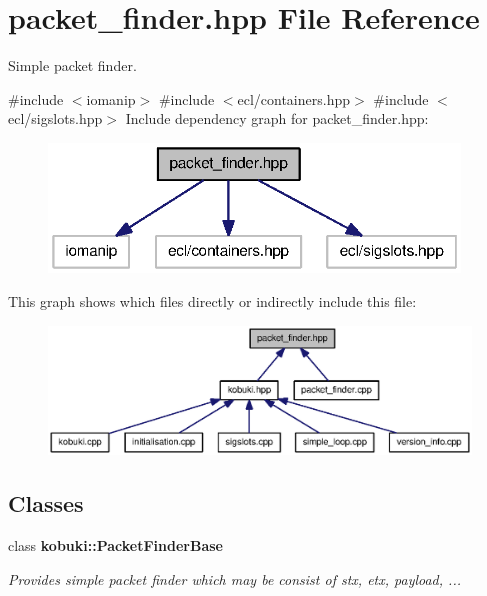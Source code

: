 \section{packet\-\_\-finder.\-hpp \-File \-Reference}
\label{packet__finder_8hpp}


\-Simple packet finder.  


{\ttfamily \#include $<$iomanip$>$}\*
{\ttfamily \#include $<$ecl/containers.\-hpp$>$}\*
{\ttfamily \#include $<$ecl/sigslots.\-hpp$>$}\*
\-Include dependency graph for packet\-\_\-finder.\-hpp\-:
\nopagebreak
\begin{figure}[H]
\begin{center}
\leavevmode
\includegraphics[width=310pt]{packet__finder_8hpp__incl}
\end{center}
\end{figure}
\-This graph shows which files directly or indirectly include this file\-:
\nopagebreak
\begin{figure}[H]
\begin{center}
\leavevmode
\includegraphics[width=350pt]{packet__finder_8hpp__dep__incl}
\end{center}
\end{figure}
\subsection*{\-Classes}
\begin{DoxyCompactItemize}
\item 
class {\bf kobuki\-::\-Packet\-Finder\-Base}
\begin{DoxyCompactList}\small\item\em \-Provides simple packet finder which may be consist of stx, etx, payload, ... \end{DoxyCompactList}\end{DoxyCompactItemize}

